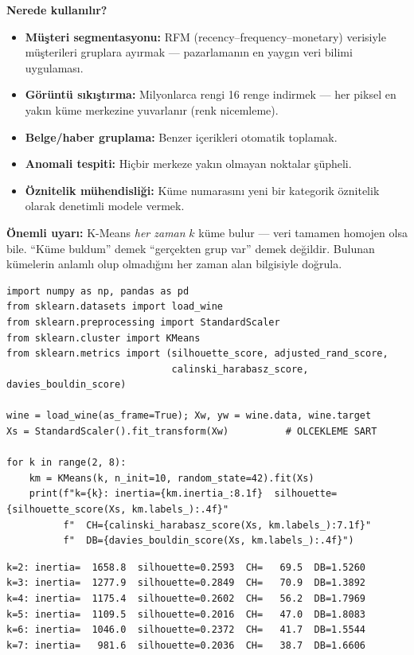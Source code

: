 \documentclass[11pt,a4paper]{article}
\begin{document}
{\textbf{Nerede kullanılır?}
\begin{itemize}\itemsep1pt
\item \textbf{Müşteri segmentasyonu:} RFM (recency--frequency--monetary)
verisiyle müşterileri gruplara ayırmak --- pazarlamanın en yaygın veri
bilimi uygulaması.
\item \textbf{Görüntü sıkıştırma:} Milyonlarca rengi 16 renge indirmek ---
her piksel en yakın küme merkezine yuvarlanır (renk nicemleme).
\item \textbf{Belge/haber gruplama:} Benzer içerikleri otomatik toplamak.
\item \textbf{Anomali tespiti:} Hiçbir merkeze yakın olmayan noktalar şüpheli.
\item \textbf{Öznitelik mühendisliği:} Küme numarasını yeni bir kategorik
öznitelik olarak denetimli modele vermek.
\end{itemize}

\textbf{Önemli uyarı:} K-Means \emph{her zaman} $k$ küme bulur --- veri
tamamen homojen olsa bile. ``Küme buldum'' demek ``gerçekten grup var''
demek değildir. Bulunan kümelerin anlamlı olup olmadığını her zaman alan
bilgisiyle doğrula.}

\begin{lstlisting}
import numpy as np, pandas as pd
from sklearn.datasets import load_wine
from sklearn.preprocessing import StandardScaler
from sklearn.cluster import KMeans
from sklearn.metrics import (silhouette_score, adjusted_rand_score,
                             calinski_harabasz_score, davies_bouldin_score)

wine = load_wine(as_frame=True); Xw, yw = wine.data, wine.target
Xs = StandardScaler().fit_transform(Xw)          # OLCEKLEME SART

for k in range(2, 8):
    km = KMeans(k, n_init=10, random_state=42).fit(Xs)
    print(f"k={k}: inertia={km.inertia_:8.1f}  silhouette={silhouette_score(Xs, km.labels_):.4f}"
          f"  CH={calinski_harabasz_score(Xs, km.labels_):7.1f}"
          f"  DB={davies_bouldin_score(Xs, km.labels_):.4f}")
\end{lstlisting}

\begin{lstlisting}[style=outstyle]
k=2: inertia=  1658.8  silhouette=0.2593  CH=   69.5  DB=1.5260
k=3: inertia=  1277.9  silhouette=0.2849  CH=   70.9  DB=1.3892
k=4: inertia=  1175.4  silhouette=0.2602  CH=   56.2  DB=1.7969
k=5: inertia=  1109.5  silhouette=0.2016  CH=   47.0  DB=1.8083
k=6: inertia=  1046.0  silhouette=0.2372  CH=   41.7  DB=1.5544
k=7: inertia=   981.6  silhouette=0.2036  CH=   38.7  DB=1.6606
\end{lstlisting}
\end{document}
